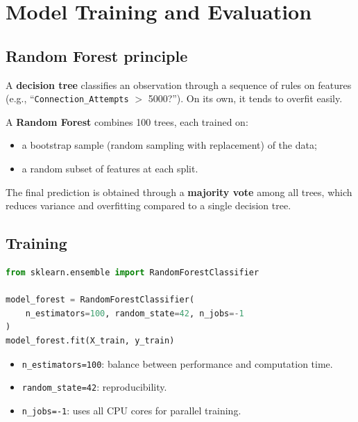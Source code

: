 \chapter{Model Training and Evaluation}

\section{Random Forest principle}

A \textbf{decision tree} classifies an observation through a sequence of rules on features (e.g., ``\texttt{Connection\_Attempts} $>$ 5000?''). On its own, it tends to overfit easily.

A \textbf{Random Forest} combines 100 trees, each trained on:
\begin{itemize}[leftmargin=*,itemsep=2pt]
    \item a bootstrap sample (random sampling with replacement) of the data;
    \item a random subset of features at each split.
\end{itemize}

The final prediction is obtained through a \textbf{majority vote} among all trees, which reduces variance and overfitting compared to a single decision tree.

\section{Training}

\begin{lstlisting}[language=Python]
from sklearn.ensemble import RandomForestClassifier

model_forest = RandomForestClassifier(
    n_estimators=100, random_state=42, n_jobs=-1
)
model_forest.fit(X_train, y_train)
\end{lstlisting}

\begin{itemize}[leftmargin=*,itemsep=2pt]
    \item \texttt{n\_estimators=100}: balance between performance and computation time.
    \item \texttt{random\_state=42}: reproducibility.
    \item \texttt{n\_jobs=-1}: uses all CPU cores for parallel training.
\end{itemize}

